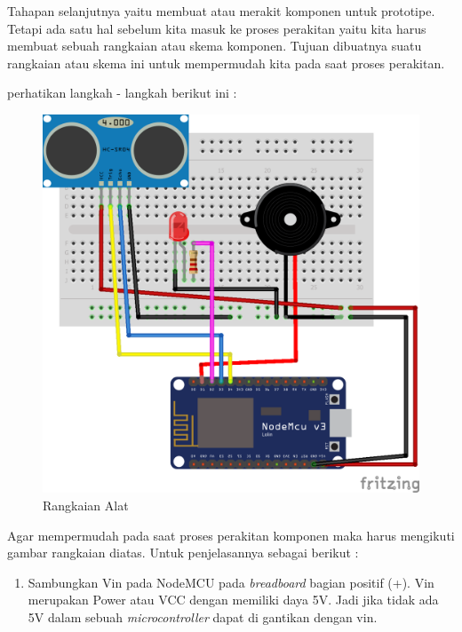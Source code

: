 \par Tahapan selanjutnya yaitu membuat atau merakit komponen untuk prototipe. Tetapi ada satu hal sebelum kita masuk ke proses perakitan yaitu kita harus membuat sebuah rangkaian atau skema komponen. Tujuan dibuatnya suatu rangkaian atau skema ini untuk mempermudah kita pada saat proses perakitan. 

perhatikan  langkah - langkah berikut ini :
\begin{figure}[H]
\centering
\includegraphics[width=1\textwidth]{figures/rangkaian.png}
\caption{Rangkaian Alat  }
\label{print}
\end{figure}

\par Agar mempermudah  pada saat proses perakitan komponen maka harus mengikuti gambar rangkaian diatas. Untuk penjelasannya sebagai berikut :
\begin{enumerate}
    \item Sambungkan Vin pada NodeMCU pada \textit{breadboard} bagian positif (+). Vin merupakan Power atau VCC dengan memiliki daya 5V. Jadi jika tidak ada 5V dalam sebuah \textit{microcontroller} dapat di gantikan dengan vin.
\end{enumerate}

